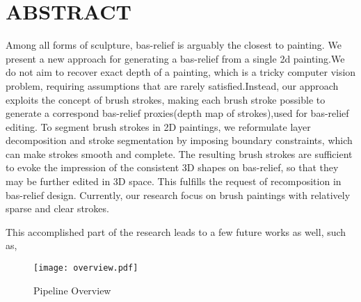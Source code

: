 \section*{\centering ABSTRACT}

Among all forms of sculpture, bas-relief is arguably the closest to painting. We present a new approach for generating a bas-relief from a single 2d painting.We do not aim to recover exact depth of a painting, which is a tricky computer vision problem, requiring assumptions that are rarely satisfied.Instead, our approach exploits the concept of brush strokes, making each brush stroke possible to generate a correspond bas-relief proxies(depth map of strokes),used for bas-relief editing. To segment brush strokes in 2D paintings, we reformulate layer decomposition and stroke segmentation by imposing boundary constraints, which can make strokes smooth and complete. The resulting brush strokes are sufficient to evoke the impression of the consistent 3D shapes on bas-relief, so that they may be further edited in 3D space. This fulfills the request of recomposition in bas-relief design. Currently, our research focus on brush paintings with relatively sparse and clear strokes. 

This accomplished part of the research leads to a few future works as well, such as, 


\begin{figure}[H]
\centering
\texttt{[image: overview.pdf]}
\caption{Pipeline Overview}
\label{pip}
\end{figure} 
 
\newpage


 


